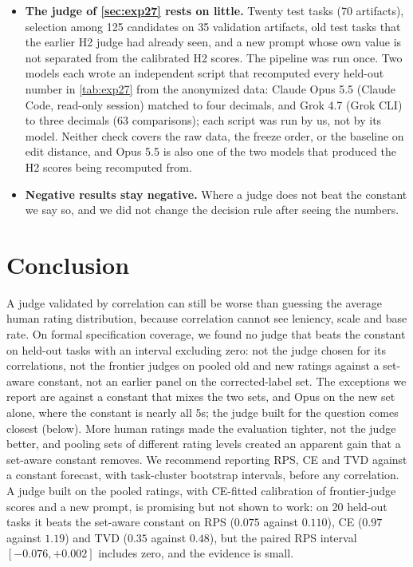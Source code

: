 \begin{itemize}
\item \textbf{The judge of \cref{sec:exp27} rests on little.} Twenty test tasks (70 artifacts), selection among 125 candidates on 35 validation artifacts, old test tasks that the earlier H2 judge had already seen, and a new prompt whose own value is not separated from the calibrated H2 scores. The pipeline was run once. Two models each wrote an independent script that recomputed every held-out number in \cref{tab:exp27} from the anonymized data: Claude Opus 5.5 (Claude Code, read-only session) matched to four decimals, and Grok 4.7 (Grok CLI) to three decimals (63 comparisons); each script was run by us, not by its model. Neither check covers the raw data, the freeze order, or the baseline on edit distance, and Opus 5.5 is also one of the two models that produced the H2 scores being recomputed from.
\item \textbf{Negative results stay negative.} Where a judge does not beat the constant we say so, and we did not change the decision rule after seeing the numbers.
\end{itemize}

\section{Conclusion}
\label{sec:conclusion}
A judge validated by correlation can still be worse than guessing the average human rating distribution, because correlation cannot see leniency, scale and base rate.
On formal specification coverage, we found no judge that beats the constant on held-out tasks with an interval excluding zero: not the judge chosen for its correlations, not the frontier judges on pooled old and new ratings against a set-aware constant, not an earlier panel on the corrected-label set. The exceptions we report are against a constant that mixes the two sets, and Opus on the new set alone, where the constant is nearly all 5s; the judge built for the question comes closest (below).
More human ratings made the evaluation tighter, not the judge better, and pooling sets of different rating levels created an apparent gain that a set-aware constant removes.
We recommend reporting RPS, CE and TVD against a constant forecast, with task-cluster bootstrap intervals, before any correlation.
A judge built on the pooled ratings, with CE-fitted calibration of frontier-judge scores and a new prompt, is promising but not shown to work: on 20 held-out tasks it beats the set-aware constant on RPS ($0.075$ against $0.110$), CE ($0.97$ against $1.19$) and TVD ($0.35$ against $0.48$), but the paired RPS interval $[-0.076,+0.002]$ includes zero, and the evidence is small.
